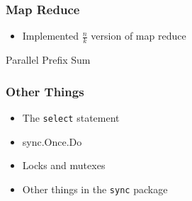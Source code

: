\documentclass{beamer}
\begin{document}
\begin{frame}[fragile] 
\frametitle{Map Reduce}
\begin{itemize}
  \item Implemented $\frac{n}{k}$ version of map reduce
\end{itemize}
\end{frame}

\begin{frame} {Parallel Prefix Sum}
\end{frame}

\begin{frame} [fragile]
\frametitle{Other Things}
\begin{itemize}
\item The \verb=select= statement
\item sync.Once.Do
\item Locks and mutexes
\item Other things in the \verb=sync= package
\end{itemize}
\end{frame}
\end{document}
